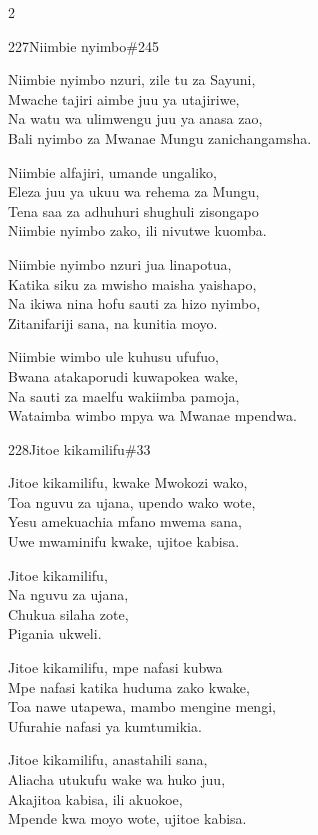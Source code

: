 \begin{multicols}{2}
\begin{hymn}{227}{Niimbie nyimbo}{\#245}
\begin{stanza}
Niimbie nyimbo nzuri, zile tu za Sayuni,\\
Mwache tajiri aimbe juu ya utajiriwe,\\
Na watu wa ulimwengu juu ya anasa zao,\\
Bali nyimbo za Mwanae Mungu zanichangamsha.
\end{stanza}
\begin{stanza}
Niimbie alfajiri, umande ungaliko,\\
Eleza juu ya ukuu wa rehema za Mungu,\\
Tena saa za adhuhuri shughuli zisongapo\\
Niimbie nyimbo zako, ili nivutwe kuomba.
\end{stanza}
\begin{stanza}
Niimbie nyimbo nzuri jua linapotua,\\
Katika siku za mwisho maisha yaishapo,\\
Na ikiwa nina hofu sauti za hizo nyimbo,\\
Zitanifariji sana, na kunitia moyo.
\end{stanza}
\begin{stanza}
Niimbie wimbo ule kuhusu ufufuo,\\
Bwana atakaporudi kuwapokea wake,\\
Na sauti za maelfu wakiimba pamoja,\\
Wataimba wimbo mpya wa Mwanae mpendwa.
\end{stanza}
\end{hymn}

\begin{hymn}{228}{Jitoe kikamilifu}{\#33}
\begin{stanza}
Jitoe kikamilifu, kwake Mwokozi wako,\\
Toa nguvu za ujana, upendo wako wote,\\
Yesu amekuachia mfano mwema sana,\\
Uwe mwaminifu kwake, ujitoe kabisa.
\end{stanza}
\begin{chorus}
Jitoe kikamilifu,\\
Na nguvu za ujana,\\
Chukua silaha zote,\\
Pigania ukweli.
\end{chorus}
\begin{stanza}
Jitoe kikamilifu, mpe nafasi kubwa\\
Mpe nafasi katika huduma zako kwake,\\
Toa nawe utapewa, mambo mengine mengi,\\
Ufurahie nafasi ya kumtumikia.
\end{stanza}
\begin{stanza}
Jitoe kikamilifu, anastahili sana,\\
Aliacha utukufu wake wa huko juu,\\
Akajitoa kabisa, ili akuokoe,\\
Mpende kwa moyo wote, ujitoe kabisa.
\end{stanza}
\end{hymn}


\end{multicols}
